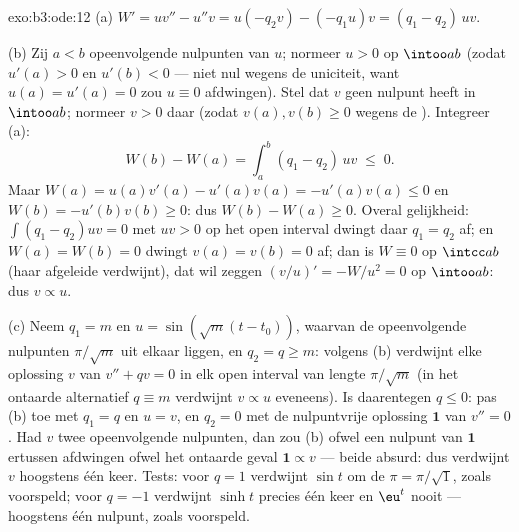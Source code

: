 \begin{solution}{exo:b3:ode:12}
(a) $W' = uv'' - u''v = u(-q_2v) - (-q_1u)v = (q_1 -
q_2)\,uv$.

(b) Zij $a < b$ opeenvolgende nulpunten van $u$; normeer $u > 0$
op $\intoo ab$ (zodat $u'(a) > 0$ en $u'(b) < 0$ --- niet nul
wegens de uniciteit, want $u(a) = u'(a) = 0$ zou $u \equiv 0$
afdwingen). Stel dat $v$ geen nulpunt heeft in $\intoo ab$;
normeer $v > 0$ daar (zodat $v(a), v(b) \geq 0$ wegens de
). Integreer (a):
\[
W(b) - W(a) = \int_a^b(q_1 - q_2)\,uv \;\leq\; 0 .
\]
Maar $W(a) = u(a)v'(a) - u'(a)v(a) = -u'(a)v(a) \leq 0$ en $W(b)
= -u'(b)v(b) \geq 0$: dus $W(b) - W(a) \geq 0$. Overal
gelijkheid: $\int(q_1 - q_2)uv = 0$ met $uv > 0$ op het open
interval dwingt daar $q_1 = q_2$ af; en $W(a) = W(b) = 0$ dwingt
$v(a) = v(b) = 0$ af; dan is $W \equiv 0$ op $\intcc ab$ (haar
afgeleide verdwijnt), dat wil zeggen $(v/u)' = -W/u^2 = 0$ op
$\intoo ab$: dus $v \propto u$.

(c) Neem $q_1 = m$ en $u = \sin(\sqrt m(t - t_0))$, waarvan de
opeenvolgende nulpunten $\pi/\sqrt m$ uit elkaar liggen, en $q_2
= q \geq m$: volgens (b) verdwijnt elke oplossing $v$ van $v'' +
qv = 0$ in elk open interval van lengte $\pi/\sqrt m$ (in het
ontaarde alternatief $q \equiv m$ verdwijnt $v \propto u$
eveneens). Is daarentegen $q \leq 0$: pas (b) toe met $q_1 = q$
en $u = v$, en $q_2 = 0$ met de nulpuntvrije oplossing $\mathbf
1$ van $v'' = 0$. Had $v$ twee opeenvolgende nulpunten, dan zou
(b) ofwel een nulpunt van $\mathbf 1$ ertussen afdwingen ofwel
het ontaarde geval $\mathbf 1 \propto v$ --- beide absurd: dus
verdwijnt $v$ hoogstens één keer. Tests: voor $q = 1$ verdwijnt
$\sin t$ om de $\pi = \pi/\sqrt1$, zoals voorspeld; voor $q = -1$
verdwijnt $\sinh t$ precies één keer en $\eu^t$ nooit ---
hoogstens één nulpunt, zoals voorspeld.
\end{solution}

